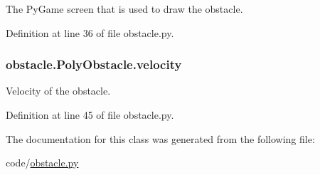 The Py\-Game screen that is used to draw the obstacle. 



Definition at line 36 of file obstacle.\-py.

\hypertarget{classobstacle_1_1PolyObstacle_adb043e45a95522cec92cd6ad35ca6595}{
\subsubsection[{velocity}]{\setlength{\rightskip}{0pt plus 5cm}obstacle.\-Poly\-Obstacle.\-velocity}}\label{classobstacle_1_1PolyObstacle_adb043e45a95522cec92cd6ad35ca6595}


Velocity of the obstacle. 



Definition at line 45 of file obstacle.\-py.



The documentation for this class was generated from the following file\-:\begin{DoxyCompactItemize}
\item 
code/\hyperlink{obstacle_8py}{obstacle.\-py}\end{DoxyCompactItemize}
